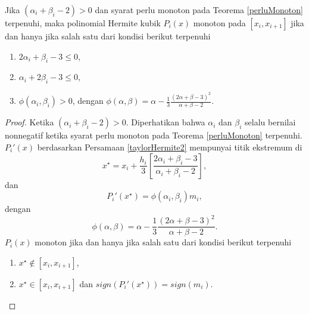 \begin{lemma}\label{lema2}
    Jika  $(\alpha_i + \beta_i - 2) > 0$ dan syarat perlu monoton pada Teorema \ref{perluMonoton} terpenuhi, maka polinomial Hermite kubik $P_i(x)$ monoton pada $[x_i,x_{i+1}]$ jika dan hanya jika salah satu dari kondisi berikut terpenuhi
    \begin{enumerate}
        \item $2\alpha_i+\beta_i-3 \leq 0$,
        \item $\alpha_i+2\beta_i-3 \leq 0$,
        \item $\phi(\alpha_i, \beta_i) > 0$, dengan $ \phi(\alpha,\beta) = \alpha - \frac{1}{3}\frac{(2\alpha + \beta -3)^2}{\alpha + \beta - 2}$.
    \end{enumerate}
\end{lemma}
\begin{proof}
Ketika $(\alpha_i + \beta_i - 2) > 0$. Diperhatikan bahwa $\alpha_i$ dan $\beta_i$ selalu bernilai nonnegatif ketika syarat perlu monoton pada Teorema \ref{perluMonoton} terpenuhi. $P_i'(x)$ berdasarkan Persamaan \eqref{taylorHermite2} mempunyai titik ekstremum di
\begin{equation}\label{3.6}
    x^\star = x_i + \frac{h_i}{3}[\frac{2\alpha_i + \beta_i - 3}{\alpha_i + \beta_i - 2}],
\end{equation}
dan
\begin{equation}
    P_i'(x^\star) = \phi(\alpha_i,\beta_i)m_i,
\end{equation}
dengan
\begin{equation}\label{3.7}
    \phi(\alpha,\beta) = \alpha - \frac{1}{3}\frac{(2\alpha + \beta -3)^2}{\alpha + \beta - 2}.
\end{equation}
$P_i(x)$ monoton jika dan hanya jika salah satu dari kondisi berikut terpenuhi
\begin{enumerate}
    \item $x^\star \notin [x_i,x_{i+1}]$,
    \item $x^\star \in [x_i,x_{i+1}]$ dan $sign(P_i'(x^\star))=sign(m_i)$.
\end{enumerate}


\end{proof}
